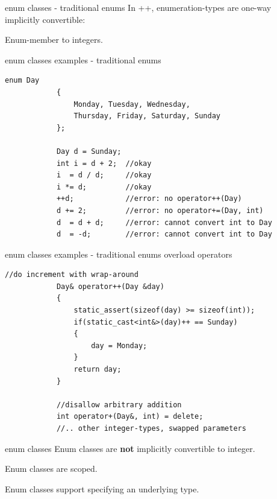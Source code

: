 	\begin{frame}{enum classes - traditional enums}
		In \C++, enumeration-types are one-way implicitly convertible:
		
		Enum-member to integers.
		
	\end{frame}
	
	\begin{frame}[fragile=singleslide]{enum classes examples - traditional enums}
		\begin{lstlisting}[gobble=12]
			enum Day
			{
			    Monday, Tuesday, Wednesday,
			    Thursday, Friday, Saturday, Sunday
			};
			
			Day d = Sunday;
			int i = d + 2;  //okay
			i  = d / d;     //okay
			i *= d;         //okay
			++d;            //error: no operator++(Day)
			d += 2;         //error: no operator+=(Day, int)
			d  = d + d;     //error: cannot convert int to Day
			d  = -d;        //error: cannot convert int to Day
		\end{lstlisting}
	\end{frame}
	
	\begin{frame}[fragile=singleslide]{enum classes examples - traditional enums overload operators}
		\begin{lstlisting}[gobble=12]
			//do increment with wrap-around
			Day& operator++(Day &day)
			{
			    static_assert(sizeof(day) >= sizeof(int));
			    if(static_cast<int&>(day)++ == Sunday)
			    {
			        day = Monday;
			    }
			    return day;
			}
			
			//disallow arbitrary addition
			int operator+(Day&, int) = delete;
			//.. other integer-types, swapped parameters
		\end{lstlisting}
	\end{frame}
	
	\begin{frame}{enum classes}
		Enum classes are \textbf{not} implicitly convertible to integer.
		
		
		\pause
		
		\emptyline
		Enum classes are scoped.
		
		
		\pause
		
		\emptyline
		Enum classes support specifying an underlying type.
		
	\end{frame}
	

